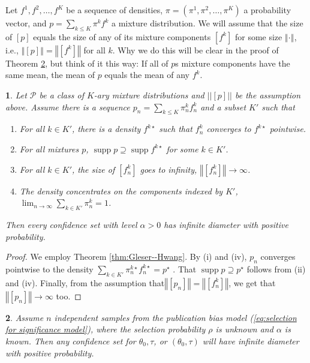 \documentclass[article]{ajs}
\numberwithin{equation}{section}
\numberwithin{figure}{section}
\theoremstyle{plain}
\newtheorem{thm}{\protect\theoremname}
\theoremstyle{definition}
\theoremstyle{definition}
\theoremstyle{plain}
\newtheorem{lem}[thm]{\protect\lemmaname}
\providecommand{\lemmaname}{Lemma}
\providecommand{\theoremname}{Theorem}
\DeclareMathOperator{\supp}{supp}
\begin{document}
Let $f^{1},f^{2},\ldots,f^{K}$ be a sequence of densities, $\pi=(\pi^{1},\pi^{2},\ldots,\pi^{K})$
a probability vector, and $p=\sum_{k\leq K}\pi^{k}f^{k}$ a mixture
distribution. We will assume that the size of $[p]$ equals the size
of any of its mixture components $[f^{k}]$ for some size $\left\Vert \cdot\right\Vert $,
i.e., $\left\Vert [p]\right\Vert =\left\Vert [f^{k}]\right\Vert $
for all $k$. Why we do this will be clear in the proof of Theorem
\ref{thm:general publication bias}, but think of it this way: If
all of $p$s mixture components have the same mean, the mean of $p$
equals the mean of any $f^{k}$. 
\begin{lem}
\label{prop:Mixture model corollary} Let $\mathcal{P}$ be a class
of $K$-ary mixture distributions and $||[p]||$ be the assumption
above. Assume there is a sequence $p_{n}=\sum_{k\leq K}\pi_{n}^{k}f_{n}^{k}$
and a subset $K'$ such that 
\begin{enumerate}
\item For all $k\in K'$, there is a density $f^{k\star}$ such that $f_{n}^{k}$
converges to $f^{k\star}$ pointwise.
\item For all mixtures $p$, $\supp p\supseteq\supp f^{k\star}$ for some
$k\in K'$.
\item For all $k\in K'$, the size of $[f_{n}^{k}]$ goes to infinity, $\left\Vert [f_{n}^{k}]\right\Vert \to\infty$.
\item The density concentrates on the components indexed by $K'$, $\lim_{n\to\infty}\sum_{k\in K'}\pi_{n}^{k}=1$.
\end{enumerate}
Then every confidence set with level $\alpha>0$ has infinite diameter
with positive probability.
\end{lem}

\begin{proof}
We employ Theorem \ref{thm:Gleser--Hwang}. By (i) and (iv), $p_{n}$
converges pointwise to the density $\sum_{k\in K'}\pi_{n}^{k\star}f_{n}^{k\star}=p^{\star}$
. That $\supp p\supseteq p^{\star}$ follows from (ii) and (iv). Finally,
from the assumption that$\left\Vert [p_{n}]\right\Vert =\left\Vert [f_{n}^{k}]\right\Vert $,
we get that $\left\Vert [p_{n}]\right\Vert \to\infty$ too. 
\end{proof}
\begin{thm}
\label{thm:general publication bias} Assume $n$ independent samples
from the publication bias model (\ref{eq:selection for significance model}),
where the selection probability $\rho$ is unknown and $\alpha$ is
known. Then any confidence set for $\theta_{0},\tau$, or $(\theta_{0},\tau)$
will have infinite diameter with positive probability.
\end{thm}
\end{document}
